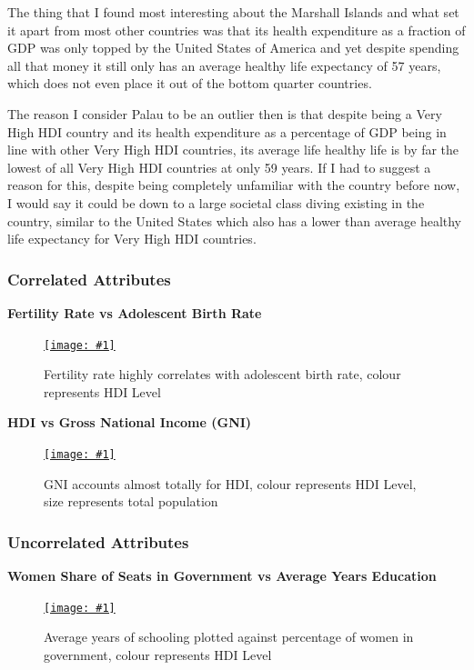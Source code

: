 \documentclass[11pt,a4paper,final]{article}
\newcommand\onlinefig[3]{
\begin{figure}[H]
  \centering
  \href{#3}{\texttt{[image: \#1]}}
  \caption{#2} 
  \label{fig:#1}
\end{figure}
}
\begin{document}
\begin{multicols}{2}
The thing that I found most interesting about the Marshall Islands and what set it apart from most other countries was that its health expenditure as a fraction of GDP was only topped by the United States of America and yet despite spending all that money it still only has an average healthy life expectancy of 57 years, which does not even place it out of the bottom quarter countries.

The reason I consider Palau to be an outlier then is that despite being a Very High HDI country and its health expenditure as a percentage of GDP being in line with other Very High HDI countries, its average life healthy life is by far the lowest of all Very High HDI countries at only 59 years. If I had to suggest a reason for this, despite being completely unfamiliar with the country before now, I would say it could be down to a large societal class diving existing in the country, similar to the United States which also has a lower than average healthy life expectancy for Very High HDI countries.

\subsubsection{Correlated Attributes}
\begin{flushleft}
\textbf{Fertility Rate vs Adolescent Birth Rate}
\end{flushleft}
\onlinefig{fertility_vs_adolescent_birth_rate_scatterplot}{Fertility rate highly correlates with adolescent birth rate, colour represents HDI Level}{https://public.tableau.com/views/CS3205-HDI/Sheet10?:language=en-GB&:display_count=n&:origin=viz_share_link}

\begin{flushleft}
\textbf{HDI vs Gross National Income (GNI)}
\end{flushleft}
\onlinefig{gni_vs_hdi_scatterplot}{GNI accounts almost totally for HDI, colour represents HDI Level, size represents total population}{https://public.tableau.com/views/CS3205-HDI/Sheet5?:language=en-GB&:display_count=n&:origin=viz_share_link}

\subsubsection{Uncorrelated Attributes}
\begin{flushleft}
\textbf{Women Share of Seats in Government vs Average Years Education}
\end{flushleft}
\onlinefig{percentage_women_in_government_vs_mean_years_education_scatterplot.png}{Average years of schooling plotted against percentage of women in government, colour represents HDI Level}{https://public.tableau.com/views/CS3205-HDI/Sheet12?:language=en-GB&:display_count=n&:origin=viz_share_link}


\end{multicols}
\end{document}
